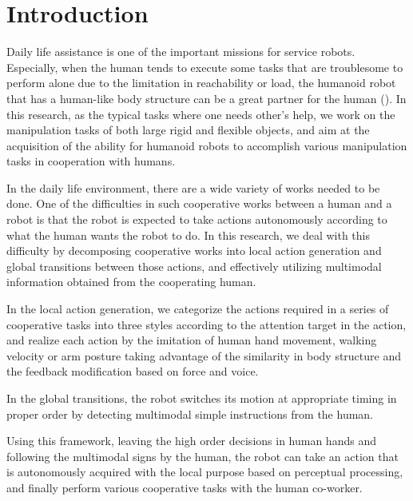 \section{Introduction}
Daily life assistance is one of the important missions for service robots. Especially, when the human tends to execute some tasks that are troublesome to perform alone due to the limitation in reachability or load, the humanoid robot that has a human-like body structure can be a great partner for the human (). In this research, as the typical tasks where one needs other's help, we work on the manipulation tasks of both large rigid and flexible objects, and aim at the acquisition of the ability for humanoid robots to accomplish various manipulation tasks in cooperation with humans.\par
In the daily life environment, there are a wide variety of works needed to be done.
One of the difficulties in such cooperative works between a human and a robot is that the robot is expected to take actions autonomously according to what the human wants the robot to do.
In this research, we deal with this difficulty by decomposing cooperative works into local action generation and global transitions between those actions, and effectively utilizing multimodal information obtained from the cooperating human.

In the local action generation, we categorize the actions required in a series of cooperative tasks into three styles according to the attention target in the action, and realize each action by the imitation of human hand movement, walking velocity or arm posture taking advantage of the similarity in body structure and the feedback modification based on force and voice.

In the global transitions, the robot switches its motion at appropriate timing in proper order by detecting multimodal simple instructions from the human.

Using this framework, leaving the high order decisions in human hands and following the multimodal signs by the human, the robot can take an action that is autonomously acquired with the local purpose based on perceptual processing, and finally perform various cooperative tasks with the human co-worker.

